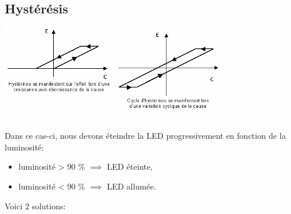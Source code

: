\documentclass[a4paper]{article}
\begin{document}
\subsection{Hystérésis}






\begin{center}
    \includegraphics[width=0.75\textwidth]{images/hysteresis-1.png}
\end{center}
Dans ce cas-ci, nous devons éteindre la LED progressivement en fonction de la luminosité:
\begin{itemize}
    \item luminosité > 90 \% $ \implies $ LED éteinte,
    \item luminosité < 90 \% $ \implies $ LED allumée.
\end{itemize}
Voici 2 solutions:
\end{document}
